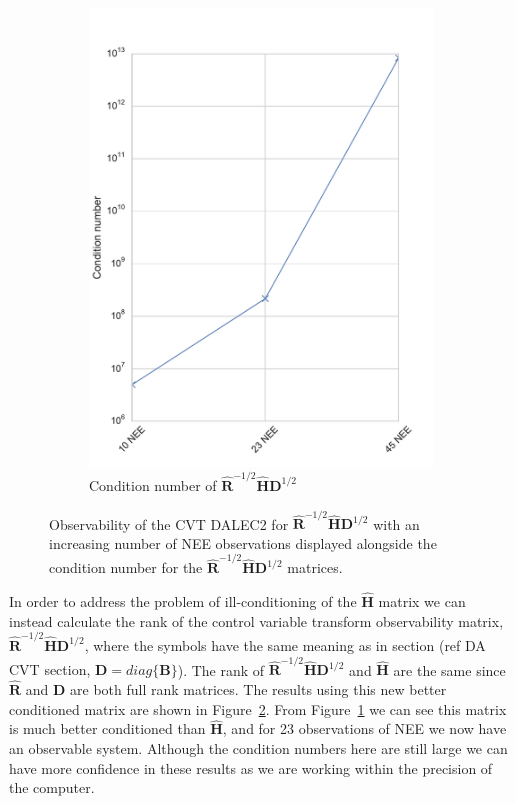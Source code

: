 \documentclass[11pt]{article}
\begin{document}
\begin{figure}[ht]
\begin{subfigure}[b]{0.4\textwidth}
        \includegraphics[width=\textwidth]{dalec2_obsrankcvtcond.pdf}
        \caption{Condition number of $\hat{\textbf{R}}^{-1/2}\hat{\textbf{H}}\textbf{D}^{1/2}$}
        \label{fig:D2_observabilitycondcvt}
    \end{subfigure}
    \caption{Observability of the CVT DALEC2 for $\hat{\textbf{R}}^{-1/2}\hat{\textbf{H}}\textbf{D}^{1/2}$ with an increasing number of NEE observations displayed alongside the condition number for the $\hat{\textbf{R}}^{-1/2}\hat{\textbf{H}}\textbf{D}^{1/2}$ matrices.}
    \label{fig:D2_cvtobservability}
\end{figure}

In order to address the problem of ill-conditioning of the $\hat{\textbf{H}}$ matrix we can instead calculate the rank of the control variable transform observability matrix, $\hat{\textbf{R}}^{-1/2}\hat{\textbf{H}}\textbf{D}^{1/2}$, where the symbols have the same meaning as in section ({\color{red}ref DA CVT section, $\textbf{D} = diag\{\textbf{B}\}$}). The rank of $\hat{\textbf{R}}^{-1/2}\hat{\textbf{H}}\textbf{D}^{1/2}$ and $\hat{\textbf{H}}$ are the same since $\hat{\textbf{R}}$ and $\textbf{D}$ are both full rank matrices. The results using this new better conditioned matrix are shown in Figure~\ref{fig:D2_cvtobservability}. From Figure~\ref{fig:D2_observabilitycondcvt} we can see this matrix is much better conditioned than $\hat{\textbf{H}}$, and for 23 observations of NEE we now have an observable system. Although the condition numbers here are still large we can have more confidence in these results as we are working within the precision of the computer.
\end{document}
